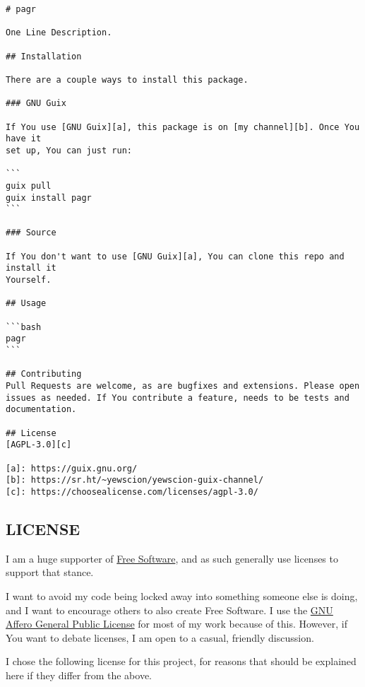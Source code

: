 \documentclass[11pt]{article}
\begin{document}
\begin{verbatim}
# pagr

One Line Description.

## Installation

There are a couple ways to install this package.

### GNU Guix

If You use [GNU Guix][a], this package is on [my channel][b]. Once You have it
set up, You can just run:

```
guix pull
guix install pagr
```

### Source

If You don't want to use [GNU Guix][a], You can clone this repo and install it
Yourself.

## Usage

```bash
pagr
```

## Contributing
Pull Requests are welcome, as are bugfixes and extensions. Please open
issues as needed. If You contribute a feature, needs to be tests and
documentation.

## License
[AGPL-3.0][c]

[a]: https://guix.gnu.org/
[b]: https://sr.ht/~yewscion/yewscion-guix-channel/
[c]: https://choosealicense.com/licenses/agpl-3.0/
\end{verbatim}

\subsection{LICENSE}
\label{sec:orgea2ffcf}
I am a huge supporter of \href{https://en.wikipedia.org/wiki/Free\_software}{Free Software}, and as such generally use licenses to
support that stance.

I want to avoid my code being locked away into something someone else is doing,
and I want to encourage others to also create Free Software. I use the \href{https://www.gnu.org/licenses/agpl-3.0.en.html}{GNU
Affero General Public License} for most of my work because of this. However, if
You want to debate licenses, I am open to a casual, friendly discussion.

I chose the following license for this project, for reasons that should be
explained here if they differ from the above.
\end{document}
